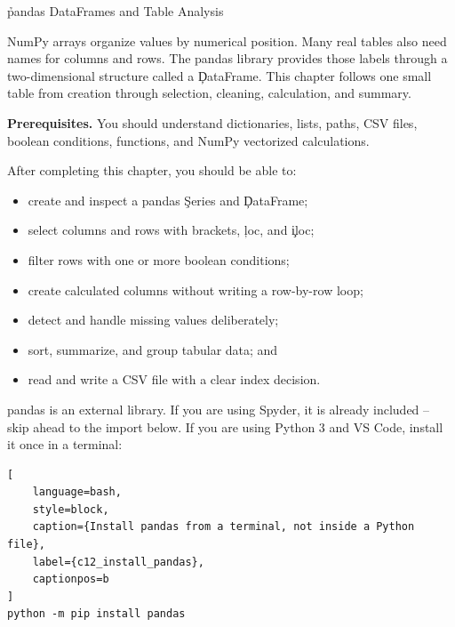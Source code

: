 
\h{pandas DataFrames and Table Analysis}
\label{ch:12}

NumPy arrays organize values by numerical position. Many real tables also need
names for columns and rows. The pandas library provides those labels through a
two-dimensional structure called a \c{DataFrame}. This chapter follows one
small table from creation through selection, cleaning, calculation, and
summary.

\begin{NoteBox}
\textbf{Prerequisites.} You should understand dictionaries, lists, paths, CSV
files, boolean conditions, functions, and NumPy vectorized calculations.
\end{NoteBox}

\begin{tcolorbox}[title=Learning outcomes,colframe=orange,colback=white,arc=2mm]
After completing this chapter, you should be able to:
\begin{itemize}
    \item create and inspect a pandas \c{Series} and \c{DataFrame};
    \item select columns and rows with brackets, \c{loc}, and \c{iloc};
    \item filter rows with one or more boolean conditions;
    \item create calculated columns without writing a row-by-row loop;
    \item detect and handle missing values deliberately;
    \item sort, summarize, and group tabular data; and
    \item read and write a CSV file with a clear index decision.
\end{itemize}
\end{tcolorbox}


pandas is an external library. If you are using Spyder, it is already
included -- skip ahead to the import below. If you are using Python 3 and
VS Code, install it once in a terminal:

\begin{lstlisting}[
    language=bash,
    style=block,
    caption={Install pandas from a terminal, not inside a Python file},
    label={c12_install_pandas},
    captionpos=b
]
python -m pip install pandas
\end{lstlisting}

